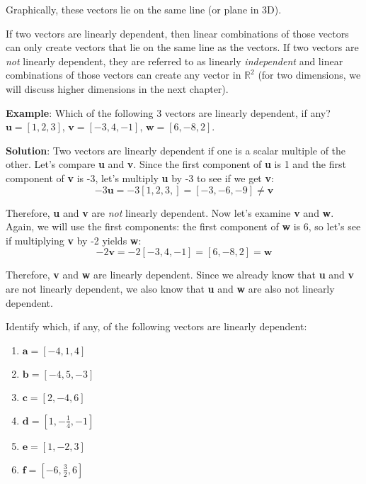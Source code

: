 Graphically, these vectors lie on the same line (or plane in 3D). 

If two vectors are linearly dependent, then linear combinations of those 
vectors can only create vectors that lie on the same line as the vectors. If 
two vectors are \textit{not} linearly dependent, they are referred to as linearly \emph{independent} and linear combinations of 
those vectors can create any vector in $\mathbb{R}^2$ (for two dimensions, we 
will discuss higher dimensions in the next chapter). 

\textbf{Example}: Which of the following 3 vectors are linearly dependent, if 
any? 
$\textbf{u} = \left[1, 2, 3 \right]$, $\textbf{v} = \left[ -3, 4, -1 \right]$, 
$\textbf{w} = \left[ 6, -8, 2 \right]$.

\textbf{Solution}: Two vectors are linearly dependent if one is a scalar 
multiple of the other. Let's compare \textbf{u} and \textbf{v}. Since the 
first component of \textbf{u} is 1 and the first component of \textbf{v} is 
-3, let's multiply \textbf{u} by -3 to see if we get \textbf{v}:
$$-3 \textbf{u} = -3 \left[ 1, 2, 3, \right] = \left[ -3, -6, -9 \right] \neq 
\textbf{v}$$

Therefore, \textbf{u} and \textbf{v} are \textit{not} linearly dependent. Now 
let's examine \textbf{v} and \textbf{w}. Again, we will use the first 
components: the first component of \textbf{w} is 6, so let's see if multiplying 
\textbf{v} by -2 yields \textbf{w}:
$$-2\textbf{v} = -2 \left[ -3, 4, -1 \right] = \left[ 6, -8, 2 \right] = 
\textbf{w}$$

Therefore, \textbf{v} and \textbf{w} are linearly dependent. Since we already 
know that \textbf{u} and \textbf{v} are not linearly dependent, we also know 
that \textbf{u} and \textbf{w} are also not linearly dependent. 

\begin{Exercise}[title = Linear Dependence, label = colinear]
Identify which, if any, of the following vectors are linearly dependent:
\begin{enumerate}
\item $\textbf{a} = \left[ -4, 1, 4 \right]$
\item $\textbf{b} = \left[ -4, 5, -3 \right]$
\item $\textbf{c} = \left[ 2, -4, 6 \right]$
\item $\textbf{d} = \left[ 1, -\frac{1}{4}, -1 \right]$
\item $\textbf{e} = \left[1, -2, 3 \right]$
\item $\textbf{f} = \left[ -6, \frac{3}{2}, 6 \right]$
\end{enumerate}
\end{Exercise}

